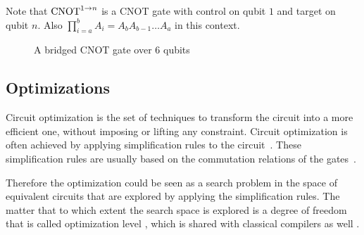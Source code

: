 Note that $\operatorname{CNOT}^{1\to n}$ is a CNOT gate with control on qubit $1$ and target on qubit $n$. Also $\prod_{i=a}^b A_i = A_b A_{b-1} \dots A_a$ in this context.

\begin{figure}[ht]
  \label{fig:bridged-cnot-m-n}
  \centering
  \caption{A bridged CNOT gate over 6 qubits}
\end{figure}


\subsection{Optimizations}

Circuit optimization is the set of techniques to transform the circuit into a more efficient one, without imposing or lifting any constraint. Circuit optimization is often achieved by applying simplification rules to the circuit~\cite{pointing2021}. These simplification rules are usually based on the commutation relations of the gates~\cite{itoko2019,qiskit2023,sivarajah2021}.

Therefore the optimization could be seen as a search problem in the space of equivalent circuits that are explored by applying the simplification rules. The matter that to which extent the search space is explored is a degree of freedom that is called optimization level \cite{qiskit2023,sivarajah2021}, which is shared with classical compilers as well \cite{aho1986}. 
